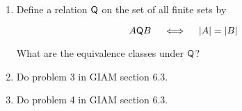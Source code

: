 \documentclass{amsart}
\begin{document}
\begin{enumerate}
\vfill

\newpage

\item Define a relation $\mbox{\textsf Q}$ on the set of all finite sets by

\[ A \mbox{\textsf Q} B \quad \iff \quad  |A| = |B| \]

What are the equivalence classes under $\mbox{\textsf Q}$?

\vfill

\item Do problem 3 in GIAM section 6.3.

\vfill

\item Do problem 4 in GIAM section 6.3.

\vfill

\end{enumerate}
\end{document}
